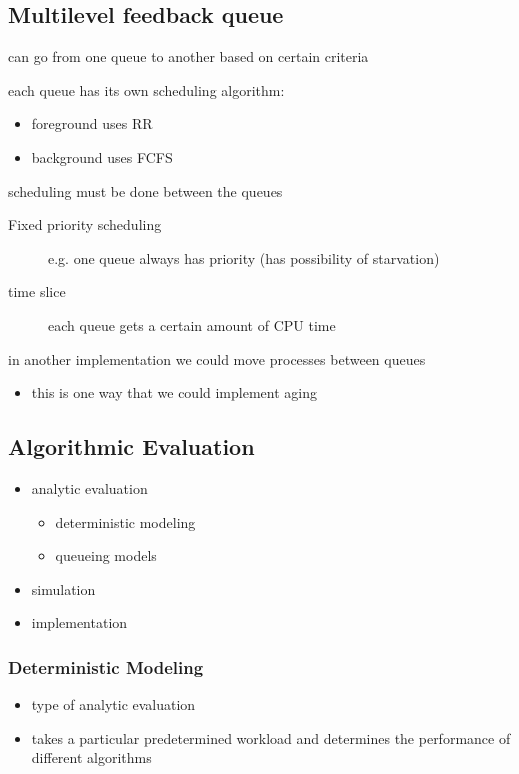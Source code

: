 \documentclass[11pt]{article}
\begin{document}
\subsection{Multilevel feedback queue}
\label{sec:orgdc67136}
\begin{description}
\item[{multilevel feedback queue}] can go from one queue to another based on certain criteria
\item each queue has its own scheduling algorithm:
\begin{itemize}
\item foreground uses RR
\item background uses FCFS
\end{itemize}
\item scheduling must be done between the queues
\begin{description}
\item[{Fixed priority scheduling}] e.g. one queue always has priority (has possibility of starvation)
\item[{time slice}] each queue gets a certain amount of CPU time
\end{description}
\item in another implementation we could move processes between queues
\begin{itemize}
\item this is one way that we could implement aging
\end{itemize}
\end{description}
\subsection{Algorithmic Evaluation}
\label{sec:org3bc5235}
\begin{itemize}
\item analytic evaluation
\begin{itemize}
\item deterministic modeling
\item queueing models
\end{itemize}
\item simulation
\item implementation
\end{itemize}
\subsubsection{Deterministic Modeling}
\label{sec:orgc234ec0}
\begin{itemize}
\item type of analytic evaluation
\item takes a particular predetermined workload and determines the performance of different algorithms
\end{itemize}
\end{document}
